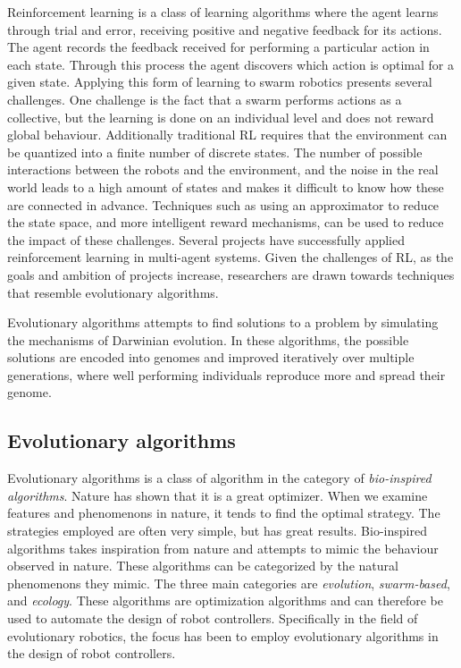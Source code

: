 Reinforcement learning is a class of learning algorithms where the agent learns through trial and error, receiving positive and negative feedback for its actions\cite{brambilla_swarm_2013}.
The agent records the feedback received for performing a particular action in each state.
Through this process the agent discovers which action is optimal for a given state.
Applying this form of learning to swarm robotics presents several challenges.
One challenge is the fact that a swarm performs actions as a collective, but the learning is done on an individual level and does not reward global behaviour\cite{brambilla_swarm_2013}.
Additionally traditional RL requires that the environment can be quantized into a finite number of discrete states\cite{schmidhuber_evolutionary_2000, brambilla_swarm_2013}.
The number of possible interactions between the robots and the environment, and the noise in the real world leads to a high amount of states and makes it difficult to know how these are connected in advance\cite{schmidhuber_evolutionary_2000}.
Techniques such as using an approximator\cite{brambilla_swarm_2013} to reduce the state space, and more intelligent reward mechanisms\cite{brambilla_swarm_2013}, can be used to reduce the impact of these challenges.
Several projects\cite{li_learning_2004, balch_behavioral_1998, mataric_interaction_1994} have successfully applied reinforcement learning in multi-agent systems.
Given the challenges of RL, as the goals and ambition of projects increase, researchers are drawn towards techniques that resemble evolutionary algorithms\cite{schmidhuber_evolutionary_2000}.

Evolutionary algorithms attempts to find solutions to a problem by simulating the mechanisms of Darwinian evolution\cite{trianni_evolving_2004}.
In these algorithms, the possible solutions are encoded into genomes and improved iteratively over multiple generations, where well performing individuals reproduce more and spread their genome.



\subsection{Evolutionary algorithms}
\label{sec:evo_alg}
Evolutionary algorithms is a class of algorithm in the category of \emph{bio-inspired algorithms}\cite{binitha_survey_2012}.
Nature has shown that it is a great optimizer.
When we examine features and phenomenons in nature, it tends to find the optimal strategy.
The strategies employed are often very simple, but has great results.
Bio-inspired algorithms takes inspiration from nature and attempts to mimic the behaviour observed in nature.
These algorithms can be categorized by the natural phenomenons they mimic.
The three main categories are \emph{evolution}, \emph{swarm-based}, and \emph{ecology}\cite{binitha_survey_2012}. 
These algorithms are optimization algorithms and can therefore be used to automate the design of robot controllers.
Specifically in the field of evolutionary robotics, the focus has been to employ evolutionary algorithms in the design of robot controllers.


